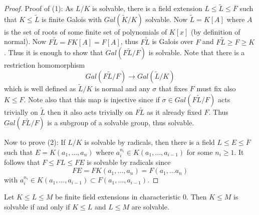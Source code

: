 \documentclass[twoside, a4paper, 10pt]{amsart}
\begin{document}
\begin{proof} Proof of (1): As $L/K$ is solvable, there is a field extension $L \leq \tilde{L} \leq \overline{F}$ such that $K \leq \tilde{L}$ is finite Galois with $Gal(\tilde{K}/K)$ solvable. Now $\tilde{L} = K[A]$ where $A$ is the set of roots of some finite set of polynomials of $K[x]$ (by definition of normal). Now $F\tilde{L} = FK[A] = F[A]$, thus $F\tilde{L}$ is Galois over $F$ and $F\tilde{L} \geq F \geq K$. Thus it is enough to show that $Gal(F\tilde{L}/F)$ is solvable. Note that there is a restriction homomorphism $$Gal(F\tilde{L}/F) \to Gal(\tilde{L}/K)$$ which is well defined as $\tilde{L}/K$ is normal and any $\sigma$ that fixes $F$ must fix also $K \leq F$. Note also that this map is injective since if $\sigma \in Gal(F\tilde{L}/F)$ acts trivially on $\tilde{L}$ then it also acts trivially on $F\tilde{L}$ as it already fixed $F$. Thus $Gal(F\tilde{L}/F)$ is a subgroup of a solvable group, thus solvable.

Now to prove (2): If $L/K$ is solvable by radicals, then there is a field $L \leq E \leq \overline{F}$ such that $E = K(a_1, \ldots, a_n)$ where $a_i^{n_i} \in K(a_1, \ldots, a_{i-1})$ for some $n_i \geq 1$. It follows that $F \leq FL \leq FE$ is solvable by radicals since $$FE = FK(a_1, \ldots, a_n) = F(a_1, \ldots a_n)$$ with $a_i^{n_i} \in K(a_1, \ldots, a_{i-1}) \subset F(a_1, \ldots, a_{i-1}).$ \end{proof}

\begin{prop} Let $K \leq L \leq M$ be finite field extensions in characteristic $0$. Then $K \leq M$ is solvable if and only if $K \leq L$ and $L \leq M$ are solvable.

\end{prop}
\end{document}

